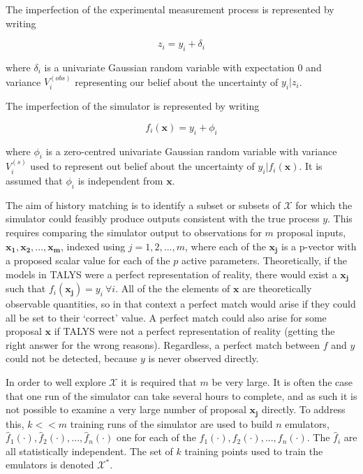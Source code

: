 \documentclass[
  12pt,
  a4paper,
  twoside]{book}
\begin{document}
The imperfection of the experimental measurement process is represented by writing

\begin{equation}
z_i = y_i + \delta_i
\label{eq:observation-uncertainty}
\end{equation}

where \(\delta_i\) is a univariate Gaussian random variable with expectation 0 and variance \(V^{(obs)}_i\) representing our belief about the uncertainty of \(y_i|z_i\).

The imperfection of the simulator is represented by writing

\begin{equation}
f_i(\mathbf{x}) = y_i + \phi_i
\label{eq:model_inadequacy}
\end{equation}

where \(\phi_i\) is a zero-centred univariate Gaussian random variable with variance \(V_i^{(s)}\) used to represent out belief about the uncertainty of \(y_i|f_i(\mathbf{x})\). It is assumed that \(\phi_i\) is independent from \(\mathbf{x}\).

The aim of history matching is to identify a subset or subsets of \(\mathcal{X}\) for which the simulator could feasibly produce outputs consistent with the true process \(y\). This requires comparing the simulator output to observations for \(m\) proposal inputs, \(\mathbf{x_1},\mathbf{x_2},...,\mathbf{x_m}\), indexed using \(j = 1,2,...,m\), where each of the \(\mathbf{x_j}\) is a p-vector with a proposed scalar value for each of the \(p\) active parameters. Theoretically, if the models in TALYS were a perfect representation of reality, there would exist a \(\mathbf{x_j}\) such that \(f_i(\mathbf{x_j})= y_i~ \forall i\). All of the the elements of \(\mathbf{x}\) are theoretically observable quantities, so in that context a perfect match would arise if they could all be set to their `correct' value. A perfect match could also arise for some proposal \(\mathbf{x}\) if TALYS were not a perfect representation of reality (getting the right answer for the wrong reasons). Regardless, a perfect match between \(f\) and \(y\) could not be detected, because \(y\) is never observed directly.

In order to well explore \(\mathcal{X}\) it is required that \(m\) be very large. It is often the case that one run of the simulator can take several hours to complete, and as such it is not possible to examine a very large number of proposal \(\mathbf{x_j}\) directly. To address this, \(k<<m\) training runs of the simulator are used to build \(n\) emulators, \(\hat{f}_1(\cdot),\hat{f}_2(\cdot),...,\hat{f}_n(\cdot)\) one for each of the \(f_1(\cdot),f_2(\cdot),...,f_n(\cdot)\). The \(\hat{f}_i\) are all statistically independent. The set of \(k\) training points used to train the emulators is denoted \(\mathcal{X}^*\).
\end{document}

